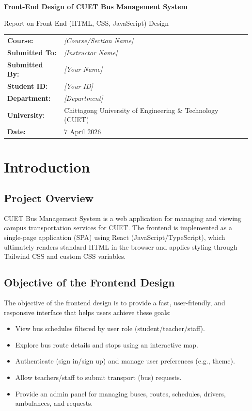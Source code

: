 \documentclass[12pt,a4paper]{report}
\newcommand{\ProjectName}{CUET Bus Management System}
\newcommand{\CourseName}{\textit{[Course/Section Name]}}
\newcommand{\SubmittedTo}{\textit{[Instructor Name]}}
\newcommand{\SubmittedBy}{\textit{[Your Name]}}
\newcommand{\StudentId}{\textit{[Your ID]}}
\newcommand{\Department}{\textit{[Department]}}
\newcommand{\University}{Chittagong University of Engineering \& Technology (CUET)}
\newcommand{\ReportDate}{7 April 2026}
\begin{document}
\begin{titlepage}
  \centering
  \vspace*{1.2cm}
  {\LARGE \textbf{Front-End Design of \ProjectName} \par}
  \vspace{1.0cm}
  {\large Report on Front-End (HTML, CSS, JavaScript) Design \par}
  \vspace{1.2cm}

  \begin{tabular}{>{\bfseries}p{4cm}p{9cm}}
    Course: & \CourseName\\
    Submitted To: & \SubmittedTo\\
    Submitted By: & \SubmittedBy\\
    Student ID: & \StudentId\\
    Department: & \Department\\
    University: & \University\\
    Date: & \ReportDate\\
  \end{tabular}

  \vfill
\end{titlepage}

\tableofcontents
\listoffigures
\listoftables
\clearpage

\chapter{Introduction}

\section{Project Overview}
\ProjectName{} is a web application for managing and viewing campus transportation services for CUET. The frontend is implemented as a single-page application (SPA) using React (JavaScript/TypeScript), which ultimately renders standard HTML in the browser and applies styling through Tailwind CSS and custom CSS variables.

\section{Objective of the Frontend Design}
The objective of the frontend design is to provide a fast, user-friendly, and responsive interface that helps users achieve these goals:
\begin{itemize}[leftmargin=1.2cm]
  \item View bus schedules filtered by user role (student/teacher/staff).
  \item Explore bus route details and stops using an interactive map.
  \item Authenticate (sign in/sign up) and manage user preferences (e.g., theme).
  \item Allow teachers/staff to submit transport (bus) requests.
  \item Provide an admin panel for managing buses, routes, schedules, drivers, ambulances, and requests.
\end{itemize}
\end{document}
